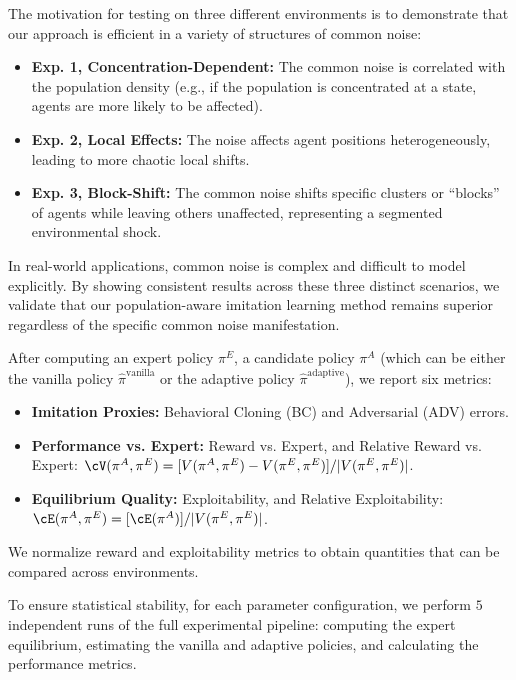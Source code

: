 \documentclass{article}
\theoremstyle{plain}
\begin{document}
The motivation for testing on three different environments is to demonstrate that our approach is efficient in a variety of structures of common noise:
\begin{itemize}%

    \item \textbf{Exp. 1, Concentration-Dependent:}
    The common noise is correlated with the population density
    (e.g., if the population is concentrated at a state, agents are more likely to be affected).

    \item \textbf{Exp. 2, Local Effects:}
    The noise affects agent positions heterogeneously, leading to more chaotic local shifts.

    \item \textbf{Exp. 3, Block-Shift:}
    The common noise shifts specific clusters or ``blocks'' of agents while leaving others unaffected, representing a segmented environmental shock.

\end{itemize}
In real-world applications, common noise is complex and difficult to model explicitly. By showing consistent results across these three distinct scenarios, we validate that our population-aware imitation learning method remains superior regardless of the specific common noise manifestation.

After computing an expert policy $\pi^E$, a candidate policy $\pi^A$ (which can be either the vanilla policy $\hat \pi^{\text{vanilla}}$ or the adaptive policy $\hat \pi^{\text{adaptive}}$), we report six metrics:
\begin{itemize}%
    \item \textbf{Imitation Proxies:} Behavioral Cloning (BC) and Adversarial (ADV) errors.
    \item \textbf{Performance vs. Expert:} Reward vs. Expert, and Relative Reward vs. Expert: $\cV(\pi^A, \pi^E) = [V(\pi^A, \pi^E) - V(\pi^E, \pi^E)] /\vert V(\pi^E, \pi^E)\vert$.
    \item \textbf{Equilibrium Quality:} Exploitability, and Relative Exploitability: $\cE(\pi^A, \pi^E) = [\cE(\pi^A)]/ \vert V(\pi^E, \pi^E)\vert$.
\end{itemize}
We normalize reward and exploitability metrics to obtain quantities that can be compared across environments. 

To ensure statistical stability, for each parameter configuration, we perform $5$ independent runs of the full experimental pipeline: computing the expert equilibrium, estimating the vanilla and adaptive policies, and calculating the performance metrics. 
\end{document}
